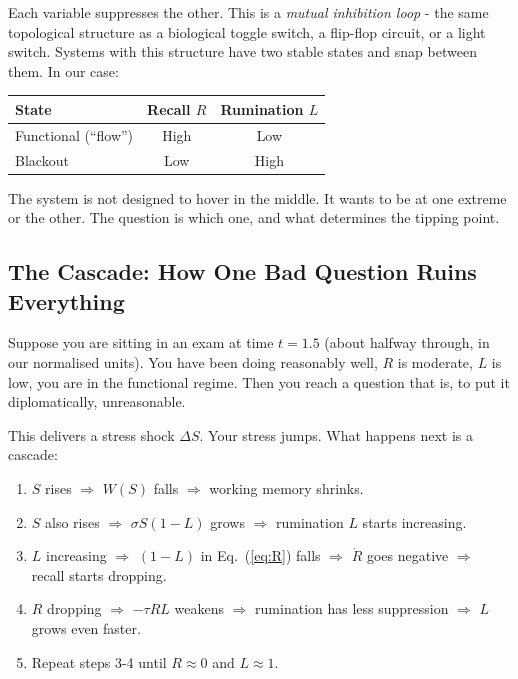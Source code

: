 \documentclass[11pt,a4paper]{article}
\begin{document}
Each variable suppresses the other. This is a \emph{mutual
inhibition loop} - the same topological structure as a biological
toggle switch, a flip-flop circuit, or a light switch. Systems with
this structure have two stable states and snap between them. In our
case:

\begin{center}
\begin{tabular}{lcc}
\toprule
\textbf{State} & \textbf{Recall $R$} & \textbf{Rumination $L$} \\
\midrule
Functional (``flow'') & High & Low \\
Blackout              & Low  & High \\
\bottomrule
\end{tabular}
\end{center}

The system is not designed to hover in the middle. It wants to be
at one extreme or the other. The question is which one, and what
determines the tipping point.

\subsection{The Cascade: How One Bad Question Ruins Everything}

Suppose you are sitting in an exam at time $t = 1.5$ (about halfway
through, in our normalised units). You have been doing reasonably
well, $R$ is moderate, $L$ is low, you are in the functional regime.
Then you reach a question that is, to put it diplomatically,
unreasonable.

This delivers a stress shock $\Delta S$. Your stress jumps. What
happens next is a cascade:

\begin{enumerate}
  \item $S$ rises $\Rightarrow$ $W(S)$ falls $\Rightarrow$ working
    memory shrinks.
  \item $S$ also rises $\Rightarrow$ $\sigma S(1-L)$ grows
    $\Rightarrow$ rumination $L$ starts increasing.
  \item $L$ increasing $\Rightarrow$ $(1-L)$ in Eq.~(\ref{eq:R})
    falls $\Rightarrow$ $\dot{R}$ goes negative $\Rightarrow$ recall
    starts dropping.
  \item $R$ dropping $\Rightarrow$ $-\tau RL$ weakens
    $\Rightarrow$ rumination has less suppression $\Rightarrow$ $L$
    grows even faster.
  \item Repeat steps 3-4 until $R \approx 0$ and $L \approx 1$.
\end{enumerate}
\end{document}
